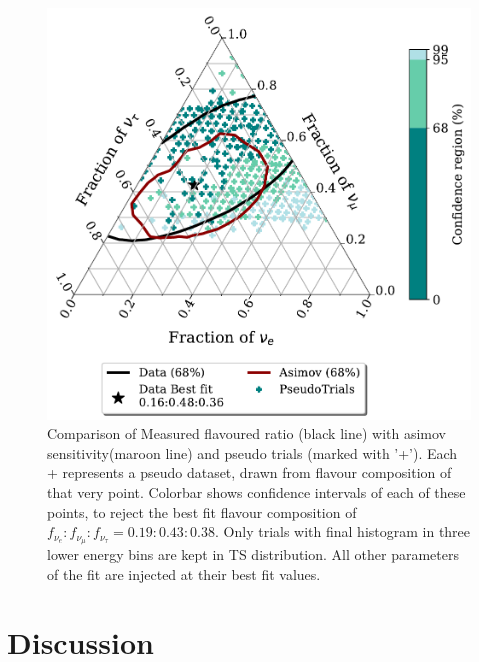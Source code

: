 \begin{figure}[h]
    
    \includegraphics{./figures/results/PE_data_asimov_68_BkgOnly.pdf}


    \caption[Comparison of Measured flavoured ratio with asimov sensitivity and pseudo trials, with subset of trials having low signal/background analysis PDFs]{Comparison of Measured flavoured ratio (black line) with asimov sensitivity(maroon line) and pseudo trials (marked with '+'). Each + represents a pseudo dataset, drawn from flavour composition of that very point. Colorbar shows confidence intervals of each of these points, to reject the best fit flavour composition of $f_{\nu_e}:f_{\nu_{\mu}}:f_{\nu_{\tau}} = 0.19:0.43:0.38$. Only trials with final histogram in three lower energy bins are kept in TS distribution. All other parameters of the fit are injected at their best fit values.}
\end{figure}

\section{Discussion}
\label{sec:results_discussion}

